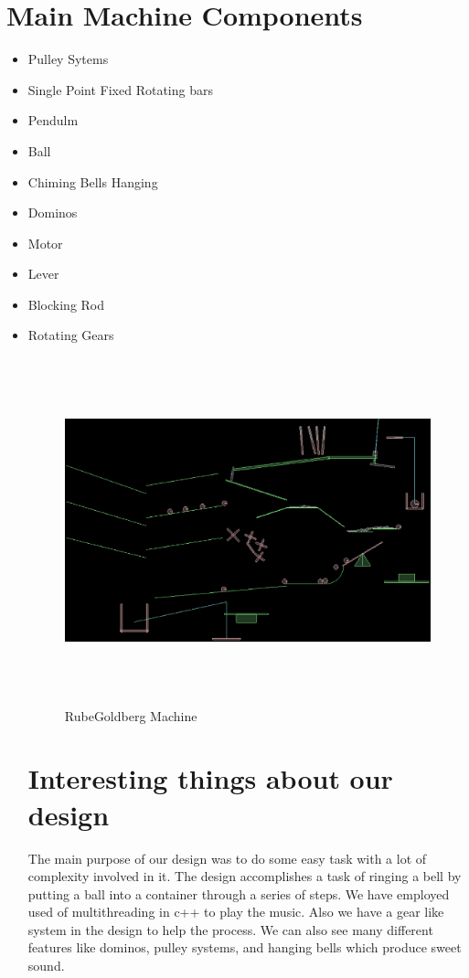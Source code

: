 \documentclass[a4paper,11pt]{article}
\begin{document}
\section{Main Machine Components}
	\begin{itemize}
		\item Pulley Sytems
		\item Single Point Fixed Rotating bars
		\item Pendulm
		\item Ball
		\item Chiming Bells Hanging
		\item Dominos
		\item Motor
		\item Lever
		\item Blocking Rod
		\item Rotating Gears
 	\begin{figure}[ht]
	\includegraphics[height=100mm]{machine.eps}
	\caption{RubeGoldberg Machine}	
	\label{fig:ResourceIntensivePlot01}
	\end{figure}
\section{Interesting things about our design}
The main purpose of our design was to do some easy task with a lot of complexity involved in it. The design accomplishes a task of ringing a bell by putting a ball into a container through a series of steps. We have employed used of multithreading in c++ to play the music. Also we have a gear like system in the design to help the process. We can also see many different features like dominos, pulley systems, and hanging bells which produce sweet sound.



\end{itemize}
\end{document}
